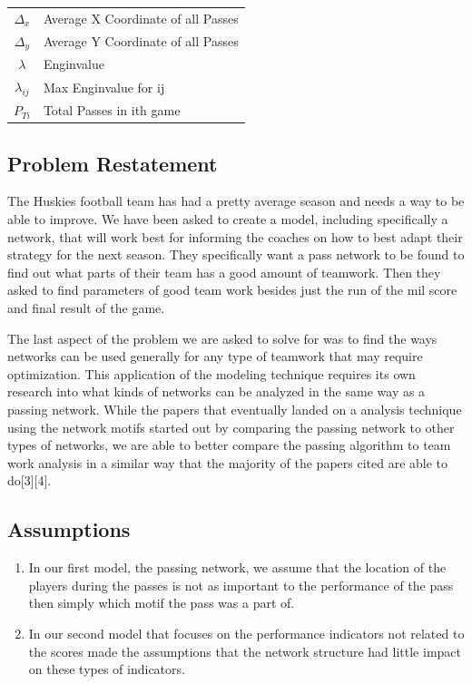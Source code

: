 \documentclass{mcmthesis}
\begin{document}
\begin{center}
\begin{tabular}{ c|l }
 $\Delta_x $&Average  X Coordinate of all Passes\\

 $\Delta_y $& Average Y Coordinate of all Passes\\

 $\lambda $ &Enginvalue \\

 $\lambda_{ij}  $ &Max Enginvalue for ij\\

 $P_{Ti} $&Total Passes in ith game \\
\hline
\end{tabular}
\end{center}

\subsection{Problem Restatement}
The Huskies football team has had a pretty average season and needs a way to be able to improve. We have been asked to create a model, including specifically a network, that will work best for informing the coaches on how to best adapt their strategy for the next season. They specifically want a pass network to be found to find out what parts of their team has a good amount of teamwork. Then they asked to find parameters of good team work besides just the run of the mil score and final result of the game. 

The last aspect of the problem we are asked to solve for was to find the ways networks can be used generally for any type of teamwork that may require optimization. This application of the modeling technique requires its own research into what kinds of networks can be analyzed in the same way as a passing network. While the papers that eventually landed on a analysis technique using the network motifs started out by comparing the passing network to other types of networks, we are able to better compare the passing algorithm to team work analysis in a similar way that the majority of the papers cited are able to do[3][4].

\subsection{Assumptions}
\begin{enumerate}
  \item In our first model, the passing network, we assume that the location of the players during the passes is not as important to the performance of the pass then simply which motif the pass was a part of.
  \item In our second model that focuses on the performance indicators not related to the scores made the assumptions that the network structure had little impact on these types of indicators. 
\end{enumerate}
\end{document}
